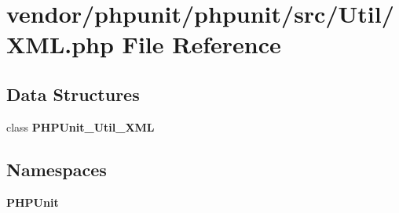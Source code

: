 \section{vendor/phpunit/phpunit/src/\+Util/\+X\+M\+L.php File Reference}
\label{phpunit_2phpunit_2src_2_util_2_x_m_l_8php}
\subsection*{Data Structures}
\begin{DoxyCompactItemize}
\item 
class {\bf P\+H\+P\+Unit\+\_\+\+Util\+\_\+\+X\+M\+L}
\end{DoxyCompactItemize}
\subsection*{Namespaces}
\begin{DoxyCompactItemize}
\item 
 {\bf P\+H\+P\+Unit}
\end{DoxyCompactItemize}
